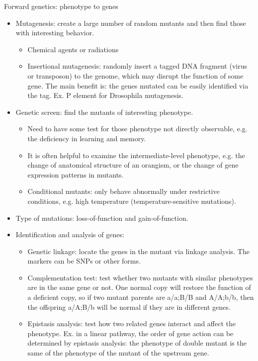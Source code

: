 \documentclass{report}
\begin{document}
Forward genetics: phenotype to genes
\begin{itemize}
\item Mutagenesis: create a large number of random mutants and then find those with interesting behavior. 
\begin{itemize}
\item Chemical agents or radiations
\item Insertional mutagenesis: randomly insert a tagged DNA fragment (virus or transposon) to the genome, which may disrupt the function of some gene. The main benefit is: the genes mutated can be easily identified via the tag. Ex. P element for Drosophila mutagenesis. 
\end{itemize}
		  
\item Genetic screen: find the mutants of interesting phenotype. 
\begin{itemize}
	\item Need to have some test for those phenotype not directly observable, e.g. the deficiency in learning and memory. 
	\item It is often helpful to examine the intermediate-level phenotype, e.g. the change of anatomical structure of an orangism, or the change of gene expression patterns in mutants. 
	\item Conditional mutants: only behave abnormally under restrictive conditions, e.g. high temperature (temperature-sensitive mutations). 
\end{itemize}

\item Type of mutations: loss-of-function and gain-of-function. 

\item Identification and analysis of genes: 
\begin{itemize}
	\item	Genetic linkage: locate the genes in the mutant via linkage analysis. The markers can be SNPs or other forms. 
	\item Complementation test: test whether two mutants with similar phenotypes are in the same gene or not. One normal copy will restore the function of a deficient copy, so if two mutant parents are a/a;B/B and A/A;b/b, then the offspring a/A;B/b will be normal if they are in different genes. 
	\item Epistasis analysis: test how two related genes interact and affect the phenotype. Ex. in a linear pathway, the order of gene action can be determined by epistasis analysis: the phenotype of double mutant is the same of the phenotype of the mutant of the upstream gene. 
\end{itemize}
\end{itemize}
\end{document}
